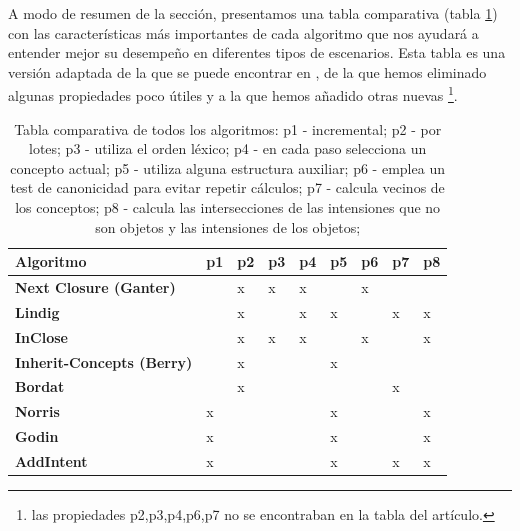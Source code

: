 \documentclass[oneside,openright,titlepage,numbers=noenddot,openany,headinclude,footinclude=true,
cleardoublepage=empty,abstractoff,BCOR=5mm,paper=a4,fontsize=12pt,main=spanish]{scrreprt}
\begin{document}
A modo de resumen de la sección, presentamos una tabla comparativa (tabla \ref{tab:comparativa}) con las características más importantes de cada algoritmo que nos ayudará a entender mejor su desempeño en diferentes tipos de escenarios. Esta tabla es una versión adaptada de la que se puede encontrar en \cite{comparingperformance}, de la que hemos eliminado algunas propiedades poco útiles y a la que hemos añadido otras nuevas \footnote{las propiedades p2,p3,p4,p6,p7 no se encontraban en la tabla del artículo.}.

\begin{table}[H]
\centering
\begin{tabular}{|l|l|l|l|l|l|l|l|l|}
\hline
Algoritmo                         & \textbf{p1} & \textbf{p2} & \textbf{p3} & \textbf{p4} & \textbf{p5} & \textbf{p6} & \textbf{p7} & \textbf{p8} \\ \hline
\textbf{Next Closure (Ganter)}   &             & x           & x           & x           &             & x           &             &             \\ \hline
\textbf{Lindig}                   &             & x           &             & x           & x           &             & x           & x           \\ \hline
\textbf{InClose}                  &             & x           & x           & x           &             & x           &             & x           \\ \hline
\textbf{Inherit-Concepts (Berry)} &             & x           &             &             & x           &             &             &             \\ \hline
\textbf{Bordat}                   &             & x           &             &             &             &             & x           &             \\ \hline
\textbf{Norris}                   & x           &             &             &             & x           &             &             & x           \\ \hline
\textbf{Godin}                    & x           &             &             &             & x           &             &             & x           \\ \hline
\textbf{AddIntent}                & x           &             &             &             & x           &             & x           & x           \\ \hline
\end{tabular}
\caption{Tabla comparativa de todos los algoritmos: 
p1 - incremental;
p2 - por lotes;
p3 - utiliza el orden léxico;
p4 - en cada paso selecciona un concepto actual;
p5 - utiliza  alguna estructura auxiliar;
p6 - emplea un test de canonicidad para evitar repetir cálculos;
p7 - calcula vecinos de los conceptos;
p8 - calcula las intersecciones de las intensiones que no son objetos y las intensiones de los objetos;}
\label{tab:comparativa}
\end{table}
\end{document}
